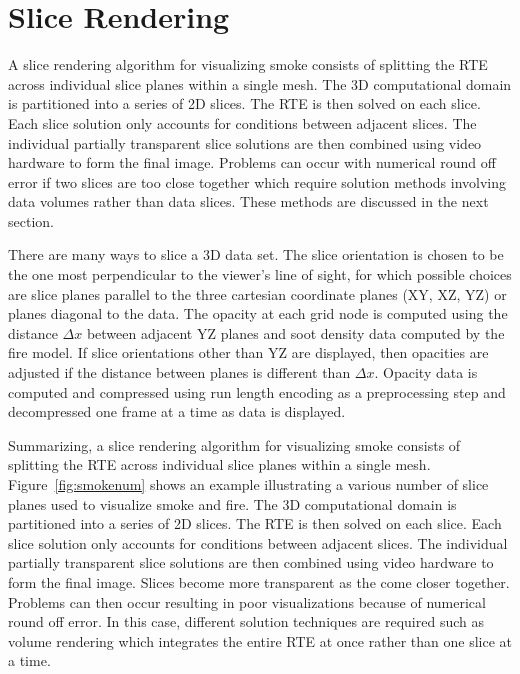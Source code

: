 {\section{Slice Rendering}
A slice rendering algorithm for visualizing smoke consists of
splitting the RTE across individual slice planes within a single
mesh.  The 3D computational domain is partitioned into a series of
2D slices.  The RTE is then solved on each slice.  Each slice
solution only accounts for conditions between adjacent slices.
The individual partially transparent slice solutions are then
combined using video hardware to form the final image.   Problems
can occur with numerical round off error if two slices are too
close together which require solution methods  involving data
volumes rather than data slices. These methods are discussed in
the next section.

There are many ways to slice a 3D data set.  The slice orientation
is chosen to be the one most perpendicular to the viewer's line of
sight, for which possible choices are slice planes parallel to the
three cartesian coordinate planes (XY, XZ, YZ) or planes diagonal
to the data.  The opacity at each grid node is computed using the
distance $\Delta x$ between adjacent YZ planes and soot density
data computed by the fire model.  If slice orientations other than
YZ are displayed, then opacities are adjusted if the distance
between planes is different than $\Delta x$.  Opacity data is
computed and compressed using run length encoding as a
preprocessing step and decompressed one frame at a time as data is
displayed.


Summarizing, a slice rendering algorithm for visualizing smoke consists of
splitting the RTE across individual slice planes within a single
mesh.  Figure~\ref{fig:smokenum} shows an example illustrating a various number
of slice planes used to visualize smoke and fire.
The 3D computational domain is partitioned into a series of
2D slices.  The RTE is then solved on each slice.  Each slice
solution only accounts for conditions between adjacent slices.
The individual partially transparent slice solutions are then
combined using video hardware to form the final image.
Slices become more transparent as the come closer together. Problems
can then occur resulting in poor  visualizations because of numerical round off error.
In this case, different solution techniques are required such as volume rendering which integrates the entire RTE at once rather than one slice at a time.

}

